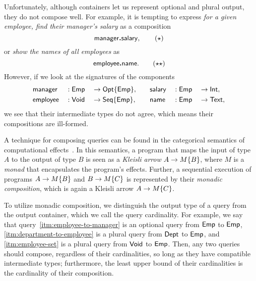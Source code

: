 Unfortunately, although containers let us represent optional and plural output,
they do not compose well.  For example, it is tempting to express \emph{for a
given employee, find their manager's salary} as a composition
\begin{equation} \label{eq:manager-to-salary}
    \mathsf{manager}\boldsymbol{.}\mathsf{salary}, \tag{$\star$}
\end{equation}
or \emph{show the names of all employees} as
\begin{equation} \label{eq:employee-to-name}
    \mathsf{employee}\boldsymbol{.}\mathsf{name}. \tag{$\star\star$}
\end{equation}
However, if we look at the signatures of the components
\begin{alignat*}{6}
    & \mathsf{manager} && : \mathsf{Emp} && \to \mathsf{Opt}{\left\{\mathsf{Emp}\right\}}, \quad && \mathsf{salary} && : \mathsf{Emp} && \to \mathsf{Int}, \\
    & \mathsf{employee} && : \mathsf{Void} && \to \mathsf{Seq}{\left\{\mathsf{Emp}\right\}}, \quad && \mathsf{name} && : \mathsf{Emp} && \to \mathsf{Text},
\end{alignat*}
we see that their intermediate types do not agree, which means their
compositions are ill-formed.

A technique for composing queries can be found in the categorical semantics of
computational effects~\cite{Moggi1991}.  In this semantics, a program that maps
the input of type $A$ to the output of type $B$ is seen as a \emph{Kleisli
arrow} $A \to M{\left\{B\right\}}$, where $M$ is a \emph{monad} that encapsulates the
program's effects.  Further, a sequential execution of programs $A \to
M{\left\{B\right\}}$ and $B \to M{\left\{C\right\}}$ is represented by their \emph{monadic
composition}, which is again a Kleisli arrow $A \to M{\left\{C\right\}}$.

To utilize monadic composition, we distinguish the output type of a query from
the output container, which we call the query cardinality.  For example, we say
that query~\ref{itm:employee-to-manager} is an optional query from $\mathsf{Emp}$ to
$\mathsf{Emp}$, \ref{itm:department-to-employee} is a plural query from $\mathsf{Dept}$ to
$\mathsf{Emp}$, and \ref{itm:employee-set} is a plural query from $\mathsf{Void}$ to $\mathsf{Emp}$.
Then, any two queries should compose, regardless of their cardinalities, so
long as they have compatible intermediate types; furthermore, the least upper
bound of their cardinalities is the cardinality of their composition.

